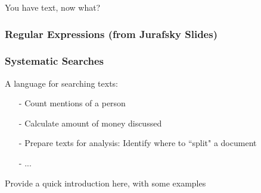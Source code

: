\documentclass{beamer}
\numberwithin{equation}{section}
\begin{document}
\begin{frame}

\huge 
You have text, now what?


\end{frame}


\begin{frame}
\frametitle{Regular Expressions (from Jurafsky Slides) } 

\begin{center}
\end{center}


\end{frame}


\begin{frame}
\frametitle{Systematic Searches}

A language for searching texts:  
\begin{itemize}
\item[-] Count mentions of a person
\item[-] Calculate amount of money discussed
\item[-] Prepare texts for analysis: Identify where to ``split" a document
\item[-] ...
\end{itemize}

Provide a quick introduction here, with some examples

\end{frame}
\end{document}
